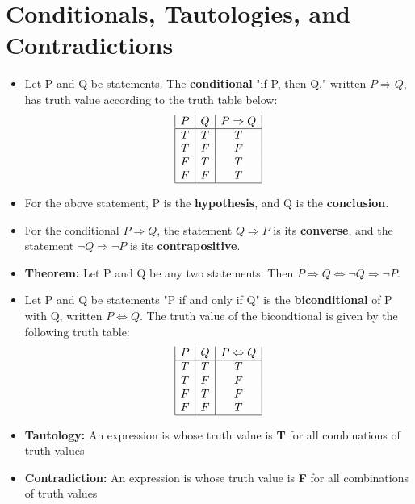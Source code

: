 \documentclass{report}
\begin{document}
 	\section{Conditionals, Tautologies, and Contradictions}
		\begin{itemize}\addtolength{\leftskip}{2em}
			\item Let P and Q be statements. The \textbf{conditional} "if P, then Q," written $P\Rightarrow Q$, has truth value according to the truth table below:
				\begin{displaymath}
				\begin{array}{|c|c|c|c|c|c|c}
				P
				& Q
				& P\Rightarrow Q\\
				\hline
				T & T & T\\
				T & F & F\\
				F & T & T\\
				F & F & T\\
				\hline
				\end{array}
				\end{displaymath}
			\item For the above statement, P is the \textbf{hypothesis}, and Q is the \textbf{conclusion}. 
			\item For the conditional $P\Rightarrow Q$, the statement $Q\Rightarrow P$ is its \textbf{converse}, and the statement $\neg Q \Rightarrow \neg P$ is its \textbf{contrapositive}.
			\item \textbf{Theorem:} Let P and Q be any two statements. Then $P\Rightarrow Q \Longleftrightarrow \neg Q \Rightarrow \neg P$.
			\item Let P and Q be statements "P if and only if Q" is the \textbf{biconditional} of P with Q, written $P\Leftrightarrow Q$. The truth value of the bicondtional is given by the following truth table:
				\begin{displaymath}
				\begin{array}{|c|c|c|c|c|c|c}
				P
				& Q
				& P \Leftrightarrow Q\\
				\hline
				T & T & T\\
				T & F & F\\
				F & T & F\\
				F & F & T\\
				\hline
				\end{array}
				\end{displaymath}
			\item \textbf{Tautology:} An expression is whose truth value is \textbf{T} for all combinations of truth values
			\item \textbf{Contradiction:} An expression is whose truth value is \textbf{F} for all combinations of truth values
		\end{itemize}
\end{document}

